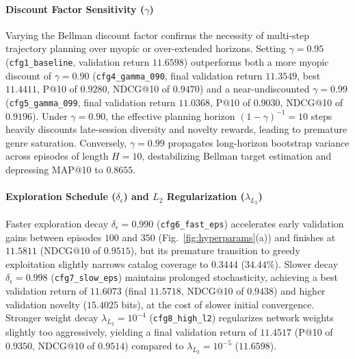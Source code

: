 \paragraph{Discount Factor Sensitivity ($\gamma$)}
Varying the Bellman discount factor confirms the necessity of multi-step trajectory planning over myopic or over-extended horizons. Setting $\gamma = 0.95$ (\texttt{cfg1\_baseline}, validation return $11.6598$) outperforms both a more myopic discount of $\gamma = 0.90$ (\texttt{cfg4\_gamma\_090}, final validation return $11.3549$, best $11.4411$, P@10 of $0.9280$, NDCG@10 of $0.9470$) and a near-undiscounted $\gamma = 0.99$ (\texttt{cfg5\_gamma\_099}, final validation return $11.0368$, P@10 of $0.9030$, NDCG@10 of $0.9196$). Under $\gamma = 0.90$, the effective planning horizon $(1-\gamma)^{-1} = 10$ steps heavily discounts late-session diversity and novelty rewards, leading to premature genre saturation. Conversely, $\gamma = 0.99$ propagates long-horizon bootstrap variance across episodes of length $H=10$, destabilizing Bellman target estimation and depressing MAP@10 to $0.8655$.

\paragraph{Exploration Schedule ($\delta_\epsilon$) and $L_2$ Regularization ($\lambda_{L_2}$)}
Faster exploration decay $\delta_\epsilon = 0.990$ (\texttt{cfg6\_fast\_eps}) accelerates early validation gains between episodes $100$ and $350$ (Fig.~\ref{fig:hyperparams}(a)) and finishes at $11.5811$ (NDCG@10 of $0.9515$), but its premature transition to greedy exploitation slightly narrows catalog coverage to $0.3444$ ($34.44\%$). Slower decay $\delta_\epsilon = 0.998$ (\texttt{cfg7\_slow\_eps}) maintains prolonged stochasticity, achieving a best validation return of $11.6073$ (final $11.5718$, NDCG@10 of $0.9438$) and higher validation novelty ($15.4025$ bits), at the cost of slower initial convergence. Stronger weight decay $\lambda_{L_2} = 10^{-4}$ (\texttt{cfg8\_high\_l2}) regularizes network weights slightly too aggressively, yielding a final validation return of $11.4517$ (P@10 of $0.9350$, NDCG@10 of $0.9514$) compared to $\lambda_{L_2} = 10^{-5}$ ($11.6598$).

